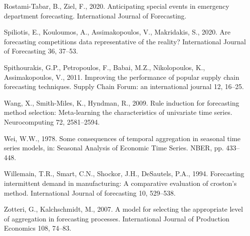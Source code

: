 \documentclass[]{elsarticle} %
\begin{document}
\leavevmode\hypertarget{ref-rostami2020anticipating}{}%
Rostami-Tabar, B., Ziel, F., 2020. Anticipating special events in
emergency department forecasting. International Journal of Forecasting.

\leavevmode\hypertarget{ref-Spiliotis2020}{}%
Spiliotis, E., Kouloumos, A., Assimakopoulos, V., Makridakis, S., 2020.
Are forecasting competitions data representative of the reality?
International Journal of Forecasting 36, 37--53.

\leavevmode\hypertarget{ref-spithourakis2011improving}{}%
Spithourakis, G.P., Petropoulos, F., Babai, M.Z., Nikolopoulos, K.,
Assimakopoulos, V., 2011. Improving the performance of popular supply
chain forecasting techniques. Supply Chain Forum: an international
journal 12, 16--25.

\leavevmode\hypertarget{ref-wang2009rule}{}%
Wang, X., Smith-Miles, K., Hyndman, R., 2009. Rule induction for
forecasting method selection: Meta-learning the characteristics of
univariate time series. Neurocomputing 72, 2581--2594.

\leavevmode\hypertarget{ref-wei1978some}{}%
Wei, W.W., 1978. Some consequences of temporal aggregation in seasonal
time series models, in: Seasonal Analysis of Economic Time Series. NBER,
pp. 433--448.

\leavevmode\hypertarget{ref-willemain1994forecasting}{}%
Willemain, T.R., Smart, C.N., Shockor, J.H., DeSautels, P.A., 1994.
Forecasting intermittent demand in manufacturing: A comparative
evaluation of croston's method. International Journal of forecasting 10,
529--538.

\leavevmode\hypertarget{ref-zotteri2007model}{}%
Zotteri, G., Kalchschmidt, M., 2007. A model for selecting the
appropriate level of aggregation in forecasting processes. International
Journal of Production Economics 108, 74--83.
\end{document}
